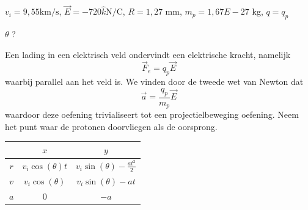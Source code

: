 \begin{description}[labelwidth=1.5cm, leftmargin=!]
    \item[Geg. :]   $v_i = 9, 55 \text{km/s}$, $\Vec{E} = -720\hat{k} \text{N/C}$, $R = 1, 27 $ mm, $m_p = 1, 67E-27$ kg, $q = q_p$
    \item[Gevr. :]  $\theta$ ?
    \item[Opl. :]  
    \item[]
        \vspace{-0.7cm}
        \begin{minipage}{0.65\textwidth}
            Een lading in een elektrisch veld ondervindt een elektrische kracht, namelijk
            \begin{equation*}
                \Vec{F}_e = q_p\Vec{E}
            \end{equation*}
            waarbij parallel aan het veld is. We vinden door de tweede wet van Newton dat
            \begin{equation*}
                \Vec{a} = \frac{q_p}{m_p}\Vec{E}
            \end{equation*}
            waardoor deze oefening trivialiseert tot een projectielbeweging oefening. Neem het punt waar de protonen doorvliegen als de oorsprong.
        \end{minipage}
        \hspace{0.5cm}\begin{minipage}{.31\textwidth}
            \begin{center}
                \def\arraystretch{2}
                \begin{tabular}{c|c|c}
                     & $x$ & $y$ \\ \hline
                     $ r $ & $  v_i\cos(\theta)t $ & $  v_i\sin(\theta) - \frac{at^2}{2} $ \\ \hline
                     $ v $ & $ v_i\cos(\theta) $ & $ v_i\sin(\theta) - at $  \\ \hline
                     $ a $ & $ 0 $ & $ -a $ 
                \end{tabular}
            \end{center}
        \end{minipage}
    

\end{description}
